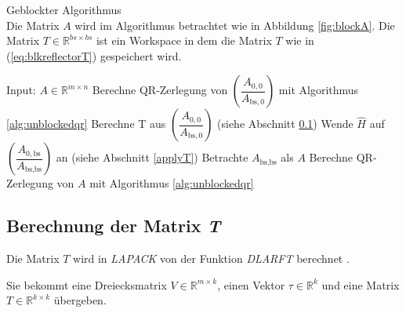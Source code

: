 \begin{algorithm}[H]
	\caption{Geblockter Algorithmus\\
	Die Matrix $A$ wird im Algorithmus betrachtet wie in Abbildung \ref{fig:blockA}. 
	Die Matrix $T \in \mathbb{R}^{bs \times bs}$ ist ein Workspace in dem die Matrix $T$ wie in (\ref{eq:blkreflectorT}) gespeichert wird. }
	\label{alg:blockedqr}
	\begin{algorithmic}[1]
		\State Input: $A \in \mathbb{R}^{m \times n}$
			\State Berechne QR-Zerlegung von  $\left(\dfrac{A_{0, 0}}{A_{\text{bs}, 0}} \right) $ mit Algorithmus \ref{alg:unblockedqr}
				\State Berechne T aus $\left(\dfrac{A_{0, 0}}{A_{\text{bs}, 0}} \right) $ (siehe Abschnitt \ref{calcT})
				\State Wende $\hat{H}$ auf $\left(\dfrac{A_{0, \text{bs}}}{A_{\text{bs}, \text{bs}}} \right) $ an (siehe Abschnitt \ref{applyT})
			\EndIf
			\State Betrachte $A_{\text{bs},\text{bs}}$ als $A$
		\EndWhile
			\State Berechne QR-Zerlegung von  $A$ mit Algorithmus \ref{alg:unblockedqr}
		\EndIf
	\end{algorithmic}
\end{algorithm}

%		
%		 


\subsection{Berechnung der Matrix \textit{T}} \label{calcT}
Die Matrix $T$ wird in \textit{LAPACK} von der Funktion \textit{DLARFT} berechnet \cite{LARFT}.

Sie bekommt eine Dreiecksmatrix $V \in \mathbb{R}^{m \times k}$, einen Vektor $\tau \in \mathbb{R}^k$ und eine Matrix $T\in \mathbb{R}^{k\times k}$ übergeben. 

